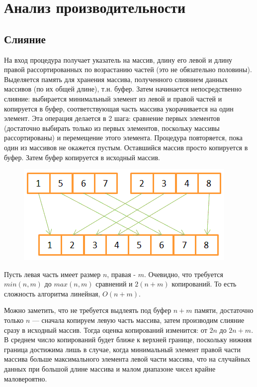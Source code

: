 \documentclass[14pt]{extarticle}
\begin{document}
\section*{Анализ производительности}

\subsection*{Слияние}

На вход процедура получает указатель на массив, длину его левой и длину правой рассортированных по возрастанию частей (это не обязательно половины). Выделяется память для хранения массива, полученного слиянием данных массивов (по их общей длине), т.н. буфер. Затем начинается непосредственно слияние: выбирается минимальный элемент из левой и правой частей и копируется в буфер, соответствующая часть массива укорачивается на один элемент. Эта операция делается в 2 шага: сравнение первых элементов (достаточно выбирать только из первых элементов, поскольку массивы рассортированы) и перемещение этого элемента. Процедура повторяется, пока один из массивов не окажется пустым. Оставшийся массив просто копируется в буфер. Затем буфер копируется в исходный массив.

\begin{figure}[H]
	\centering
	\includegraphics[scale=1]{merge}
\end{figure}

Пусть левая часть имеет размер $n$, правая - $m$.
Очевидно, что требуется $ min(n, m) $ до $ max(n, m) $ сравнений и $ 2(n+m) $ копирований. То есть сложность алгоритма линейная, $ O(n+m) $.

Можно заметить, что не требуется выдлеять под буфер $n+m$ памяти, достаточно только $n$ --- сначала копируем левую часть массива, затем производим слияние сразу в исходный массив.
Тогда оценка копирований изменится: от $2n$ до $2n+m$. В среднем число копирований будет ближе к верхней границе, поскольку нижняя граница достижима лишь в случае, когда минимальный элемент правой части массива больше максимального элемента левой части массива, что на случайных данных при большой длине массива и малом диапазоне чисел крайне маловероятно.
\end{document}
